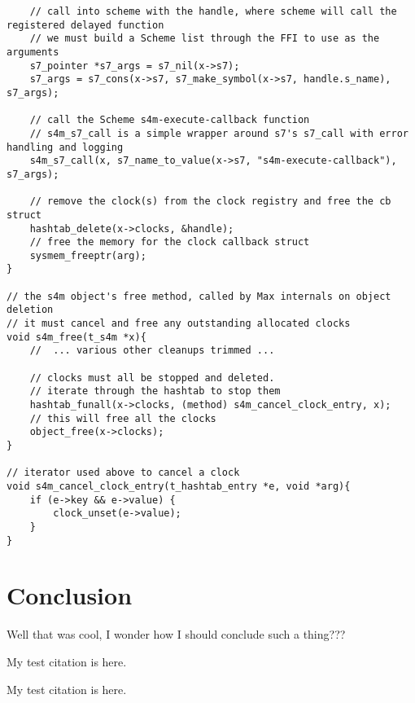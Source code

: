 \documentclass[acmsmall]{acmart}
\begin{document}
\begin{verbatim}
    // call into scheme with the handle, where scheme will call the registered delayed function
    // we must build a Scheme list through the FFI to use as the arguments
    s7_pointer *s7_args = s7_nil(x->s7);
    s7_args = s7_cons(x->s7, s7_make_symbol(x->s7, handle.s_name), s7_args); 

    // call the Scheme s4m-execute-callback function
    // s4m_s7_call is a simple wrapper around s7's s7_call with error handling and logging 
    s4m_s7_call(x, s7_name_to_value(x->s7, "s4m-execute-callback"), s7_args);   

    // remove the clock(s) from the clock registry and free the cb struct
    hashtab_delete(x->clocks, &handle);
    // free the memory for the clock callback struct 
    sysmem_freeptr(arg);
}

// the s4m object's free method, called by Max internals on object deletion
// it must cancel and free any outstanding allocated clocks
void s4m_free(t_s4m *x){ 
    //  ... various other cleanups trimmed ...

    // clocks must all be stopped and deleted. 
    // iterate through the hashtab to stop them 
    hashtab_funall(x->clocks, (method) s4m_cancel_clock_entry, x);
    // this will free all the clocks
    object_free(x->clocks); 
} 

// iterator used above to cancel a clock
void s4m_cancel_clock_entry(t_hashtab_entry *e, void *arg){
    if (e->key && e->value) {
        clock_unset(e->value);    
    }
}

\end{verbatim}


\section{Conclusion}
Well that was cool, I wonder how I should conclude such a thing???




My test citation \cite{Cohen07} is here.

My test citation \cite{Abril07} is here.



\end{document}

